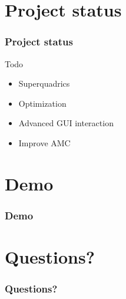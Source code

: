 \documentclass[t]{beamer}
\begin{document}
\section{Project status}
\begin{frame}
\frametitle{Project status}
Todo
\begin{itemize}
 \item Superquadrics
 \item Optimization
 \item Advanced GUI interaction
 \item Improve AMC
\end{itemize}
\end{frame}

\section{Demo}
\begin{frame}
\frametitle{Demo}
\end{frame}

\section{Questions?}
\begin{frame}
\frametitle{Questions?}
\end{frame}
\end{document}

